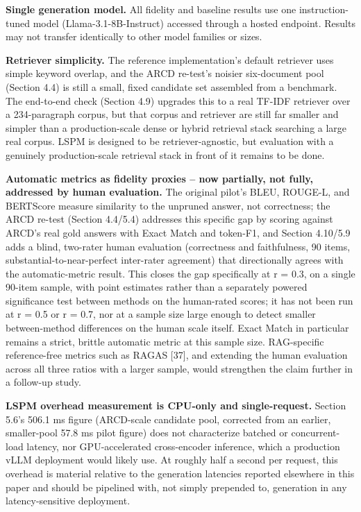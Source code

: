 \textbf{Single generation model.} All fidelity and baseline results use one instruction-tuned model (Llama-3.1-8B-Instruct) accessed through a hosted endpoint. Results may not transfer identically to other model families or sizes.

\textbf{Retriever simplicity.} The reference implementation's default retriever uses simple keyword overlap, and the ARCD re-test's noisier six-document pool (Section 4.4) is still a small, fixed candidate set assembled from a benchmark. The end-to-end check (Section 4.9) upgrades this to a real TF-IDF retriever over a 234-paragraph corpus, but that corpus and retriever are still far smaller and simpler than a production-scale dense or hybrid retrieval stack searching a large real corpus. LSPM is designed to be retriever-agnostic, but evaluation with a genuinely production-scale retrieval stack in front of it remains to be done.

\textbf{Automatic metrics as fidelity proxies -- now partially, not fully, addressed by human evaluation.} The original pilot's BLEU, ROUGE-L, and BERTScore measure similarity to the unpruned answer, not correctness; the ARCD re-test (Section 4.4/5.4) addresses this specific gap by scoring against ARCD's real gold answers with Exact Match and token-F1, and Section 4.10/5.9 adds a blind, two-rater human evaluation (correctness and faithfulness, 90 items, substantial-to-near-perfect inter-rater agreement) that directionally agrees with the automatic-metric result. This closes the gap specifically at r = 0.3, on a single 90-item sample, with point estimates rather than a separately powered significance test between methods on the human-rated scores; it has not been run at r = 0.5 or r = 0.7, nor at a sample size large enough to detect smaller between-method differences on the human scale itself. Exact Match in particular remains a strict, brittle automatic metric at this sample size. RAG-specific reference-free metrics such as RAGAS [37], and extending the human evaluation across all three ratios with a larger sample, would strengthen the claim further in a follow-up study.

\textbf{LSPM overhead measurement is CPU-only and single-request.} Section 5.6's 506.1 ms figure (ARCD-scale candidate pool, corrected from an earlier, smaller-pool 57.8 ms pilot figure) does not characterize batched or concurrent-load latency, nor GPU-accelerated cross-encoder inference, which a production vLLM deployment would likely use. At roughly half a second per request, this overhead is material relative to the generation latencies reported elsewhere in this paper and should be pipelined with, not simply prepended to, generation in any latency-sensitive deployment.

